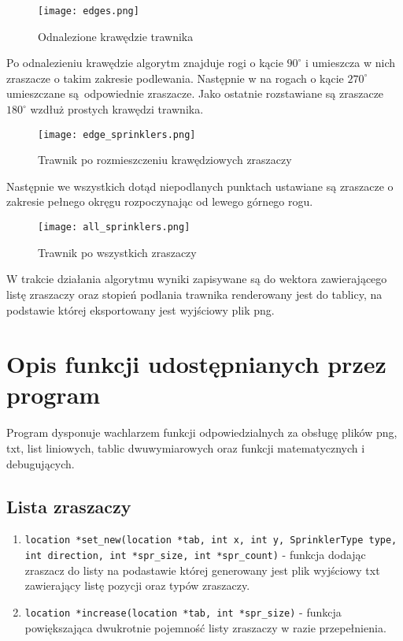 \documentclass[a4paper]{article}
\begin{document}
\begin{figure}[H]
    \texttt{[image: edges.png]}
    \centering
    \caption{Odnalezione krawędzie trawnika}
\end{figure}

Po odnalezieniu krawędzie algorytm znajduje rogi o kącie \(90^{\circ}\) i umieszcza w nich zraszacze o takim zakresie podlewania. Następnie w na rogach o kącie \(270^{\circ}\) umieszczane są odpowiednie zraszacze. Jako ostatnie rozstawiane są zraszacze \(180^{\circ}\) wzdłuż prostych krawędzi trawnika.

\begin{figure}[H]
    \texttt{[image: edge\_sprinklers.png]}
    \centering
    \caption{Trawnik po rozmieszczeniu krawędziowych zraszaczy}
\end{figure}

Następnie we wszystkich dotąd niepodlanych punktach ustawiane są zraszacze o zakresie pełnego okręgu rozpoczynając od lewego górnego rogu.

\begin{figure}[H]
    \texttt{[image: all\_sprinklers.png]}
    \centering
    \caption{Trawnik po wszystkich zraszaczy}
\end{figure}

W trakcie działania algorytmu wyniki zapisywane są do wektora zawierającego listę zraszaczy oraz stopień podlania trawnika renderowany jest do tablicy, na podstawie której eksportowany jest wyjściowy plik png.

\section{Opis funkcji udostępnianych przez program}

Program dysponuje wachlarzem funkcji odpowiedzialnych za obsługę plików png, txt, list liniowych, tablic dwuwymiarowych oraz funkcji matematycznych i debugujących.

\subsection{Lista zraszaczy}
\begin{enumerate}
    \item \texttt{location *set_new(location *tab, int x, int y, SprinklerType type, int direction, int *spr_size, int *spr_count)} - funkcja dodając zraszacz do listy na podastawie której generowany jest plik wyjściowy txt zawierający listę pozycji oraz typów zraszaczy.
    \item \texttt{location *increase(location *tab, int *spr_size)} - funkcja powiększająca dwukrotnie pojemność listy zraszaczy w razie przepełnienia.
\end{enumerate}
\end{document}
